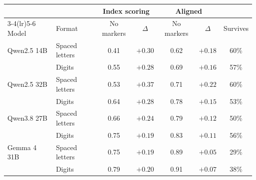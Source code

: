 \begin{tabular}{ll cc cc c}
\toprule
& & \multicolumn{2}{c}{Index scoring} & \multicolumn{2}{c}{Aligned} & \\
\cmidrule(lr){3-4}\cmidrule(lr){5-6}
Model & Format & No markers & $\Delta$ & No markers & $\Delta$ & Survives \\
\midrule
Qwen2.5 14B & Spaced letters & 0.41 & $+0.30$ & 0.62 & $+0.18$ & 60\% \\
 & Digits & 0.55 & $+0.28$ & 0.69 & $+0.16$ & 57\% \\
Qwen2.5 32B & Spaced letters & 0.53 & $+0.37$ & 0.71 & $+0.22$ & 60\% \\
 & Digits & 0.64 & $+0.28$ & 0.78 & $+0.15$ & 53\% \\
Qwen3.8 27B & Spaced letters & 0.66 & $+0.24$ & 0.79 & $+0.12$ & 50\% \\
 & Digits & 0.75 & $+0.19$ & 0.83 & $+0.11$ & 56\% \\
Gemma 4 31B & Spaced letters & 0.75 & $+0.19$ & 0.89 & $+0.05$ & 29\% \\
 & Digits & 0.79 & $+0.20$ & 0.91 & $+0.07$ & 38\% \\
\bottomrule
\end{tabular}
